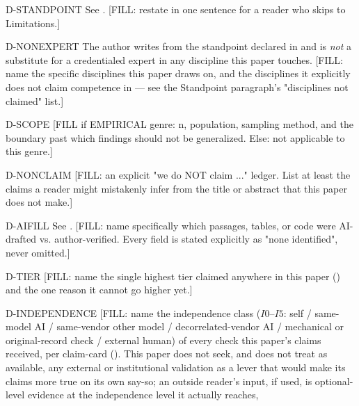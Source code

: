 

\begin{disclaimers}
  \item[D-STANDPOINT] See . [FILL: restate in one
    sentence for a reader who skips to Limitations.]
  \item[D-NONEXPERT] The author writes from the standpoint declared in
     and is \emph{not} a substitute for a credentialed
    expert in any discipline this paper touches. [FILL: name the specific
    disciplines this paper draws on, and the disciplines it explicitly does
    not claim competence in --- see the Standpoint paragraph's "disciplines
    not claimed" list.]
  \item[D-SCOPE] [FILL if EMPIRICAL genre: n, population, sampling method,
    and the boundary past which findings should not be generalized. Else:
    not applicable to this genre.]
  \item[D-NONCLAIM] [FILL: an explicit "we do NOT claim ..." ledger. List at
    least the claims a reader might mistakenly infer from the title or
    abstract that this paper does not make.]
  \item[D-AIFILL] See . [FILL: name specifically
    which passages, tables, or code were AI-drafted vs. author-verified.
    Every field is stated explicitly as "none identified", never omitted.]
  \item[D-TIER] [FILL: name the single highest tier claimed anywhere in this
    paper (\Cref{tab:tiers}) and the one reason it cannot go higher yet.]
  \item[D-INDEPENDENCE] [FILL: name the independence class (\(I0\)--\(I5\):
    self / same-model AI / same-vendor other model / decorrelated-vendor AI /
    mechanical or original-record check / external human) of every check
    this paper's claims received, per claim-card ().
    This paper does not seek, and does not treat as available,
    any external or institutional validation as a lever that would make its
    claims more true on its own say-so; an outside reader's input, if used,
    is optional-level evidence at the independence level it actually reaches,

\end{disclaimers}
